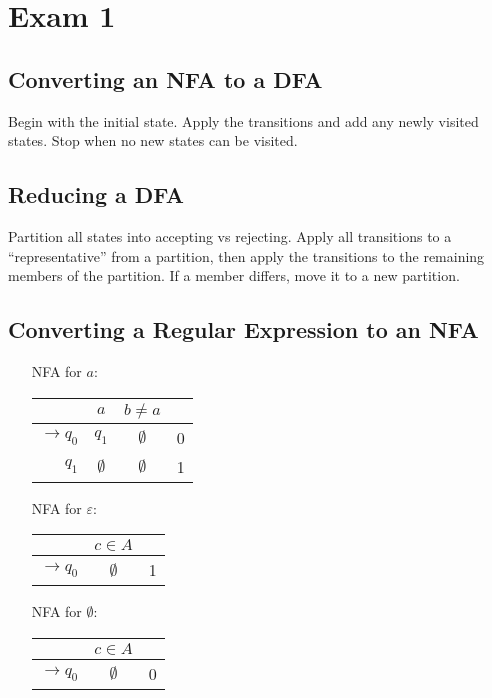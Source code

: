 \section{Exam 1}\label{subsec:exam-1-cheatsheet}
\subsection{Converting an NFA to a DFA}
Begin with the initial state. Apply the transitions and add any newly visited states. Stop when no new states can be visited. 

\subsection{Reducing a DFA}
Partition all states into accepting vs rejecting. Apply all transitions to a ``representative'' from a partition, then apply the transitions to the remaining members of the partition. If a member differs, move it to a new partition. 
\subsection{Converting a Regular Expression to an NFA}
\begin{enumerate}

\item[NFA for \(a\):]\begin{center}\begin{tabular}{r c c r}
    & \(a\) & \(b\neq a\) & \\\bottomrule
    \(\to q_0\) & \(q_1\) & \(\emptyset \) & 0\\
    \(q_1\) & \(\emptyset \) & \(\emptyset \) & 1\\
\end{tabular}\end{center}

\item[NFA for \(\varepsilon \):]\begin{center}\begin{tabular}{r c r}
    & \(c\in A\) & \\\bottomrule
    \(\to q_0\) & \(\emptyset \) & 1\\
\end{tabular}\end{center}

\item[NFA for \(\emptyset \):]\begin{center}\begin{tabular}{r c r}
    & \(c\in A\) & \\\bottomrule
    \(\to q_0\) & \(\emptyset \) & 0\\
\end{tabular}\end{center}
\end{enumerate}

